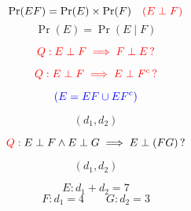 
\begin{frame}{}

  \[
    \Pr(EF) = \Pr(E) \times \Pr(F)\quad \textcolor{red}{(E \perp F)}
  \]
  \pause
  \[
    \Pr(E) = \Pr(E \mid F)
  \]

  \pause
  \[
    \textcolor{red}{Q: E \perp F \implies F \perp E\,?}
  \]

  \pause
  \[
    \textcolor{red}{Q: E \perp F \implies E \perp F^{c}\,?}
  \]

  \pause
  \vspace{-0.40cm}
  \[
    \textcolor{blue}{(E = EF \cup EF^{c})}
  \]
\end{frame}

% 
% 

\begin{frame}{}
  \[
    (d_1, d_2)
  \]



\end{frame}

\begin{frame}{}
  \[
    \textcolor{red}{Q:}\; E \perp F \land E \perp G \implies E \perp (FG)\,?
  \]

  \pause
  \[
    (d_1, d_2)
  \]

  \pause
  \[
    E: d_1 + d_2 = 7
  \]
  \[
    F: d_1 = 4 \qquad G: d_2 = 3
  \]
\end{frame}
